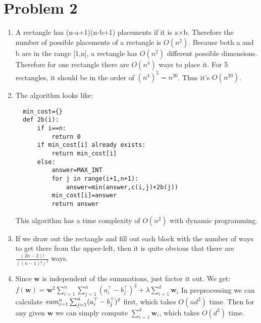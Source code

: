 \documentclass[12pt]{article}
\begin{document}
\section*{Problem 2}

\begin{enumerate}[label=(\alph*)]
  \item A rectangle has (n-a+1)(n-b+1) placements if it is a$\times$b. Therefore the number of possible placements of a rectangle is $O(n^2).$\newline
  Because both a and b are in the range [1,n], a rectangle has $O(n^2)$ different possible dimensions.\newline
  Therefore for one rectangle there are $O(n^4)$ ways to place it.\newline
  For 5 rectangles, it should be in the order of $(n^4)^5=n^{20}$. Thus it's $O(n^{20})$.
  \item The algorithm looks like:\newline
  \begin{verbatim}
  min_cost={}
  def 2b(i):
      if i==n:
          return 0
      if min_cost[i] already exists:
          return min_cost[i]
      else:
          answer=MAX_INT
          for j in range(i+1,n+1):
              answer=min(answer,c(i,j)+2b(j))
          min_cost[i]=answer
          return answer
   \end{verbatim}
   This algorithm has a time complexity of $O(n^2)$ with dynamic programming.
   \item If we draw out the rectangle and fill out each block with the number of ways to get there from the upper-left, then it is quite obvious that there are $\frac{(2n-2)!}{((n-1)!)^2}$ ways.
   \item Since $\mathbf w$ is independent of the summations, just factor it out. We get:\newline
   $f(\mathbf w) = \mathbf w^2 \sum_{i=1}^n \sum_{j=1}^n (a_i^\top - b_j^\top)^2 + \lambda \mathbf \sum_{i=1}^d \mathbf{w}_i$\newline
   In preprocessing we can calculate $\\sum_{i=1}^n \sum_{j=1}^n (a_i^\top - b_j^\top)^2$ first, which takes $O(nd^2)$ time. Then for any given $\mathbf{w}$ we can simply compute $\sum_{i=1}^d \mathbf{w}_i$, which takes $O(d^2)$ time.
\end{enumerate}
\end{document}
